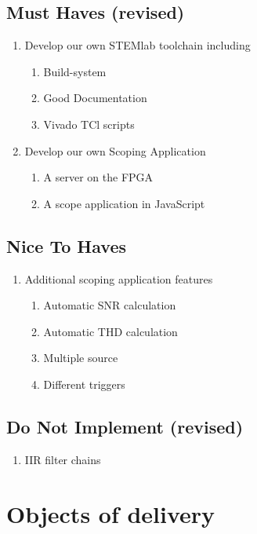 \documentclass[a4paper,oneside]{alpenspecs/alpenspecs}
\begin{document}
\section{Must Haves (revised)}
\begin{enumerate}
    \item Develop our own STEMlab toolchain including
    \begin{enumerate}
        \item Build-system
        \item Good Documentation
        \item Vivado TCl scripts
    \end{enumerate}
    \item Develop our own Scoping Application
    \begin{enumerate}
        \item A server on the FPGA
        \item A scope application in JavaScript
    \end{enumerate}
\end{enumerate}

\section{Nice To Haves}
\begin{enumerate}
    \item Additional scoping application features
    \begin{enumerate}
        \item Automatic SNR calculation
        \item Automatic THD calculation
        \item Multiple source
        \item Different triggers
    \end{enumerate}
\end{enumerate}

\section{Do Not Implement (revised)}
\begin{enumerate}
    \item IIR filter chains
\end{enumerate}

\chapter{Objects of delivery} %
\label{ch:objectives}
\end{document}
